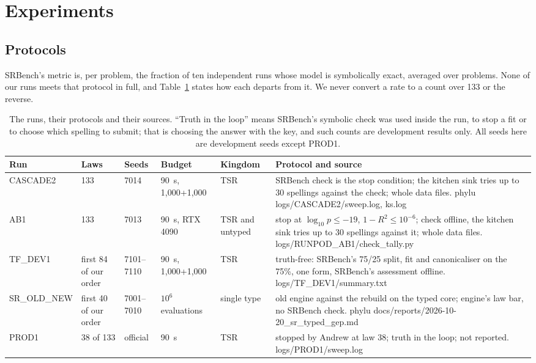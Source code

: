 \documentclass[sigconf,nonacm]{acmart}
\newcommand{\src}[1]{{\small\ttfamily #1}}
\begin{document}
\section{Experiments}
\label{sec:experiments}

\subsection{Protocols}

SRBench's metric is, per problem, the fraction of ten independent runs whose
model is symbolically exact, averaged over problems. None of our runs meets
that protocol in full, and Table~\ref{tab:protocols} states how each departs
from it. We never convert a rate to a count over 133 or the reverse.

\begin{table}[t]
\caption{The runs, their protocols and their sources. ``Truth in the loop''
means SRBench's symbolic check was used inside the run, to stop a fit or to
choose which spelling to submit; that is choosing the answer with the key, and
such counts are development results only. All seeds here are development seeds
except PROD1.}
\label{tab:protocols}
\small
\begin{tabular}{@{}lllllp{}@{}}
\toprule
Run & Laws & Seeds & Budget & Kingdom & Protocol and source \\
\midrule
CASCADE2 & 133 & 7014 & 90~s, 1{,}000+1{,}000 & TSR & SRBench check is the stop condition; the kitchen sink tries up to 30 spellings against the check; whole data files. \src{phylu logs/\allowbreak{}CASCADE2/\allowbreak{}sweep.\allowbreak{}log}, \src{ks.\allowbreak{}log} \\
AB1 & 133 & 7013 & 90~s, RTX 4090 & TSR and untyped & stop at $\log_{10}p\le-19$, $1-R^2\le10^{-6}$; check offline, the kitchen sink tries up to 30 spellings against it; whole data files. \src{logs/\allowbreak{}RUNPOD\_\allowbreak{}AB1/\allowbreak{}check\_\allowbreak{}tally.\allowbreak{}py} \\
TF\_DEV1 & first 84 of our order & 7101--7110 & 90~s, 1{,}000+1{,}000 & TSR & truth-free: SRBench's 75/25 split, fit and canonicaliser on the 75\%, one form, SRBench's assessment offline. \src{logs/\allowbreak{}TF\_\allowbreak{}DEV1/\allowbreak{}summary.\allowbreak{}txt} \\
SR\_OLD\_NEW & first 40 of our order & 7001--7010 & $10^6$ evaluations & single type & old engine against the rebuild on the typed core; engine's law bar, no SRBench check. \src{phylu docs/\allowbreak{}reports/\allowbreak{}2026-10-20\_\allowbreak{}sr\_\allowbreak{}typed\_\allowbreak{}gep.\allowbreak{}md} \\
PROD1 & 38 of 133 & official & 90~s & TSR & stopped by Andrew at law 38; truth in the loop; not reported. \src{logs/\allowbreak{}PROD1/\allowbreak{}sweep.\allowbreak{}log} \\
\bottomrule
\end{tabular}
\end{table}
\end{document}
